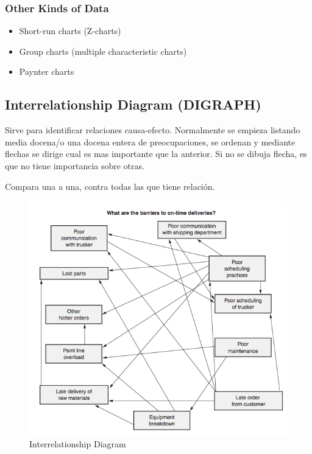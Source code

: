 \documentclass[]{article}
\begin{document}
\subsubsection{Other Kinds of Data}

\begin{itemize}
	\item Short-run charts (Z-charts)
	\item Group charts (multiple characteristic charts)
	\item Paynter charts
\end{itemize}

\subsection{Interrelationship Diagram (DIGRAPH)}

Sirve para identificar relaciones causa-efecto. Normalmente se empieza listando media docena/o una docena entera de preocupaciones, se ordenan y mediante flechas se dirige cual es mas importante que la anterior. Si no se dibuja flecha, es que no tiene importancia sobre otras.

Compara una a una, contra todas las que tiene relación. 

\begin{figure}[ht!]
	\centering
	\includegraphics[width=120mm]{imagenes/interrelationshipdiagram.png}
	\caption{Interrelationship Diagram}
	\label{fig:interrelationshipdiagram}
\end{figure}
\end{document}
